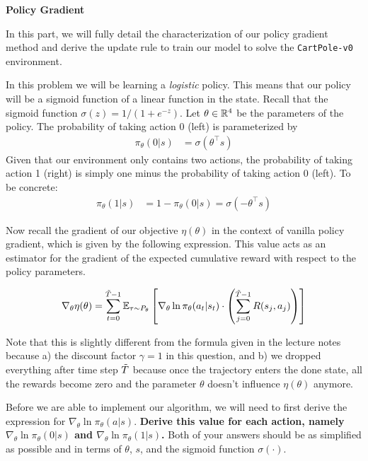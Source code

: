 \item {} 
\textbf{Policy Gradient}

In this part, we will fully detail the characterization of our policy gradient method and derive the update rule to train our model to solve the {\tt CartPole-v0} environment.

In this problem we will be learning a \textit{logistic} policy. This means that our policy will be a sigmoid function of a linear function in the state. 
Recall that the sigmoid function $\sigma(z) = 1 / (1 + e^{-z})$. Let $\theta \in \mathbb{R}^4$ be the parameters of the policy. 
The probability of taking action 0 (left) is parameterized by 
\begin{align*}
    \pi_\theta(0 | s) &= \sigma(\theta^\top s) 
\end{align*}
Given that our environment only contains two actions, the probability of taking action 1 (right) is simply one minus the probability of taking action 0 (left). To be concrete:
\begin{align*}
\pi_\theta(1 | s) &= 1 - \pi_\theta(0 | s) = \sigma(-\theta^\top s)
\end{align*}

Now recall the gradient of our objective $\eta(\theta)$ in the context of vanilla policy gradient, which is given by the following expression. This value acts as an estimator for the gradient of the expected cumulative reward with respect to the policy parameters.

\begin{align*}
    \nabla_\theta \eta(\theta) = \sum_{t=0}^{\tilde{T} - 1} \mathbb{E}_{\tau \sim P_\theta} \left[ \nabla_\theta \ln \pi_\theta(a_t | s_t) \cdot \left( \sum_{j = 0}^{\tilde{T} - 1}R(s_j, a_j) \right) \right]
\end{align*}

Note that this is slightly different from the formula given in the lecture notes because a) the discount factor $\gamma=1$ in this question, and b) we dropped everything after time step $\tilde{T}$ because once the trajectory enters the done state, all the rewards become zero and the parameter $\theta$ doesn't influence $\eta(\theta)$ anymore. 

Before we are able to implement our algorithm, we will need to first derive the expression for $\nabla_\theta \ln \pi_\theta(a | s)$. 
\textbf{Derive this value for each action, namely $\nabla_\theta \ln \pi_\theta(0 | s)$ and $\nabla_\theta \ln \pi_\theta(1 | s)$.} Both of your answers should be as simplified as possible and in terms of $\theta$, $s$, and the sigmoid function $\sigma(\cdot)$.

